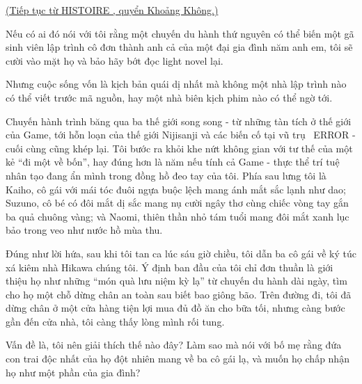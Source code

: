 ﻿\documentclass[../main.tex]{subfiles}
\begin{document}

\begin{center}
    \uline{(Tiếp tục từ {\flaregothic HISTOIRE }, quyển Khoảng Không.)}
\end{center}



Nếu có ai đó nói với tôi rằng một chuyến du hành thứ nguyên có thể biến một gã sinh viên lập trình cô đơn thành anh cả của một đại gia đình năm anh em, tôi sẽ cười vào mặt họ và bảo hãy bớt đọc light novel lại.

Nhưng cuộc sống vốn là kịch bản quái dị nhất mà không một nhà lập trình nào có thể viết trước mã nguồn, hay một nhà biên kịch phim nào có thể ngờ tới.

Chuyến hành trình băng qua ba thế giới song song - từ những tàn tích ở thế giới của Game, tới hỗn loạn của thế giới Nijisanji và các biến cố tại vũ trụ \hll\ ERROR - cuối cùng cũng khép lại. Tôi bước ra khỏi khe nứt không gian với tư thế của một kẻ ``đi một về bốn'', hay đúng hơn là năm nếu tính cả Game - thực thể trí tuệ nhân tạo đang ẩn mình trong đồng hồ đeo tay của tôi. Phía sau lưng tôi là Kaiho, cô gái với mái tóc đuôi ngựa buộc lệch mang ánh mắt sắc lạnh như dao; Suzuno, cô bé có đôi mắt dị sắc mang nụ cười ngây thơ cùng chiếc vòng tay gắn ba quả chuông vàng; và Naomi, thiên thần nhỏ tám tuổi mang đôi mắt xanh lục bảo trong veo như nước hồ mùa thu.

Đúng như lời hứa, sau khi tôi tan ca lúc sáu giờ chiều, tôi dẫn ba cô gái về ký túc xá kiêm nhà Hikawa chúng tôi. Ý định ban đầu của tôi chỉ đơn thuần là giới thiệu họ như những ``món quà lưu niệm kỳ lạ'' từ chuyến du hành dài ngày, tìm cho họ một chỗ dừng chân an toàn sau biết bao giông bão. Trên đường đi, tôi đã dừng chân ở một cửa hàng tiện lợi mua đủ đồ ăn cho bữa tối, nhưng càng bước gần đến cửa nhà, tôi càng thấy lòng mình rối tung.

Vấn đề là, tôi nên giải thích thế nào đây? Làm sao mà nói với bố mẹ rằng đứa con trai độc nhất của họ đột nhiên mang về ba cô gái lạ, và muốn họ chấp nhận họ như một phần của gia đình?
\end{document}
